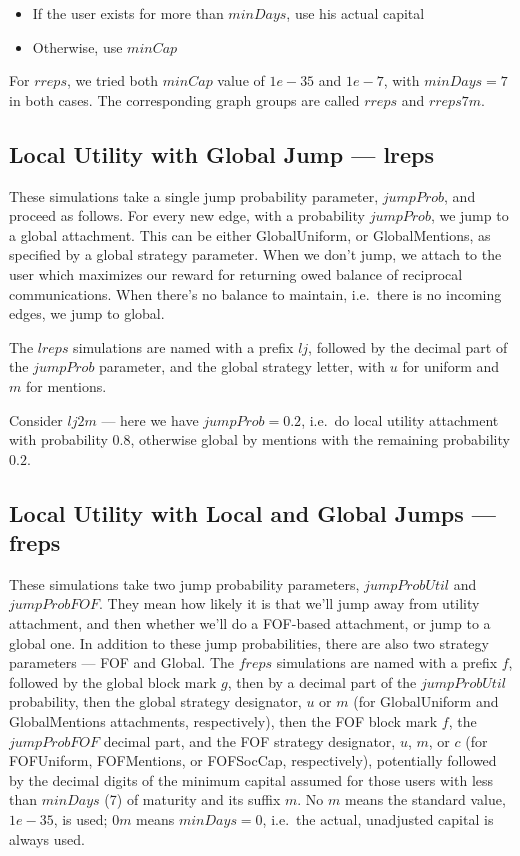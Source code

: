 \documentclass[10pt,oneside]{memoir}
\begin{document}
\begin{itemize}


\item If the user exists for more than $minDays$, use his actual capital

\item Otherwise, use $minCap$
\end{itemize}

For $rreps$, we tried both $minCap$ value of $1e-35$ and $1e-7$, with $minDays = 7$ in both cases.  The corresponding graph groups are called $rreps$ and $rreps7m$.


\subsection{Local Utility with Global Jump --- lreps}
\label{localutilitywithglobaljumplreps}

These simulations take a single jump probability parameter, $jumpProb$, and proceed as follows.  For every new edge, with a probability $jumpProb$, we jump to a global attachment.  This can be either GlobalUniform, or GlobalMentions, as specified by a global strategy parameter.  When we don't jump, we attach to the user which maximizes our reward for returning owed balance of reciprocal communications.  When there's no balance to maintain, i.e.\ there is no incoming edges, we jump to global.


The $lreps$ simulations are named with a prefix $lj$, followed by the decimal part of the $jumpProb$ parameter, and the global strategy letter, with $u$ for uniform and $m$ for mentions.


Consider $lj2m$ --- here we have $jumpProb = 0.2$, i.e.\ do local utility attachment with probability $0.8$, otherwise global by mentions with the remaining probability $0.2$.


\subsection{Local Utility with Local and Global Jumps --- freps}
\label{localutilitywithlocalandglobaljumpsfreps}

These simulations take two jump probability parameters, $jumpProbUtil$ and $jumpProbFOF$.  They mean how likely it is that we'll jump away from utility attachment, and then whether we'll do a FOF-based attachment, or jump to a global one.  In addition to these jump probabilities, there are also two strategy parameters --- FOF and Global.
The $freps$ simulations are named with a prefix $f$, followed by the global block mark $g$, then by a decimal part of the $jumpProbUtil$ probability, then the global strategy designator, $u$ or $m$ (for GlobalUniform and GlobalMentions attachments, respectively), then the FOF block mark $f$, the $jumpProbFOF$ decimal part, and the FOF strategy designator, $u$, $m$, or $c$ (for FOFUniform, FOFMentions, or FOFSocCap, respectively), potentially followed by the decimal digits of the minimum capital assumed for those users with less than $minDays$ (7) of maturity and its suffix $m$.  No $m$ means the standard value, $1e-35$, is used; $0m$ means $minDays = 0$, i.e.\ the actual, unadjusted capital is always used.
\end{document}
